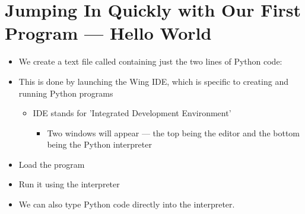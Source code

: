 \documentclass[letterpaper,10pt,english]{sphinxmanual}
\begin{document}
\section{Jumping In Quickly with Our First Program — Hello World}
\label{\detokenize{lecture_notes/lec01_intro:jumping-in-quickly-with-our-first-program-hello-world}}\begin{itemize}
\item {} 
We create a text file called  containing just the two lines of Python code:

%
\begin{sphinxVerbatim}[commandchars=\\\{\}]
\end{sphinxVerbatim}

\item {} 
This is done by launching the Wing IDE, which is specific to creating
and running Python programs
\begin{itemize}
\item {} 
IDE stands for ’Integrated Development Environment’
\begin{itemize}
\item {} 
Two windows will appear — the top being the editor and the bottom
being the Python interpreter

\end{itemize}

\end{itemize}

\item {} 
Load the  program

\item {} 
Run it using the interpreter

\item {} 
We can also type Python code directly into the interpreter.

\end{itemize}
\end{document}
